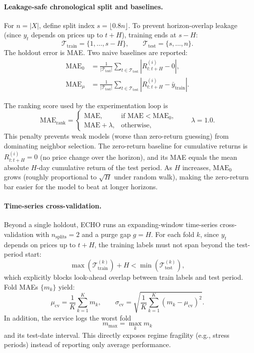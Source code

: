 \documentclass[12pt,a4paper,titlepage]{article}
\begin{document}
\paragraph{Leakage-safe chronological split and baselines.}
For \(n=|X|\), define split index \(s=\lfloor0.8n\rfloor\). To prevent horizon-overlap leakage (since \(y_t\) depends on prices up to \(t+H\)), training ends at \(s-H\):
\[
\mathcal{T}_{\text{train}} = \{1,\dots,s-H\},
\qquad
\mathcal{T}_{\text{test}} = \{s,\dots,n\}.
\]
The holdout error is MAE. Two naive baselines are reported:
\begin{align*}
\text{MAE}_{0} &= \frac{1}{|\mathcal{T}_{\text{test}}|}\sum_{t\in\mathcal{T}_{\text{test}}} |R_{t:t+H}^{(i)} - 0|, \\
\text{MAE}_{\mu} &= \frac{1}{|\mathcal{T}_{\text{test}}|}\sum_{t\in\mathcal{T}_{\text{test}}} |R_{t:t+H}^{(i)} - \bar{y}_{\text{train}}|.
\end{align*}

The ranking score used by the experimentation loop is
\[
\text{MAE}_{\text{rank}}=
\begin{cases}
\text{MAE}, & \text{if } \text{MAE}<\text{MAE}_0,\\
\text{MAE}+\lambda, & \text{otherwise},
\end{cases}
\qquad \lambda=1.0.
\]
This penalty prevents weak models (worse than zero-return guessing) from dominating neighbor selection. The zero-return baseline for cumulative returns is \(R_{t:t+H}^{(i)} = 0\) (no price change over the horizon), and its MAE equals the mean absolute \(H\)-day cumulative return of the test period. As \(H\) increases, \(\text{MAE}_0\) grows (roughly proportional to \(\sqrt{H}\) under random walk), making the zero-return bar easier for the model to beat at longer horizons.

\paragraph{Time-series cross-validation.}
Beyond a single holdout, ECHO runs an expanding-window time-series cross-validation with \(n_{\text{splits}}=2\) and a purge gap \(g=H\). For each fold \(k\), since \(y_t\) depends on prices up to \(t+H\), the training labels must not span beyond the test-period start:
\[
\max(\mathcal{T}^{(k)}_{\text{train}}) + H < \min(\mathcal{T}^{(k)}_{\text{test}}),
\]
which explicitly blocks look-ahead overlap between train labels and test period. Fold MAEs \(\{m_k\}\) yield:
\[
\mu_{\text{cv}}=\frac{1}{K}\sum_{k=1}^{K}m_k,
\qquad
\sigma_{\text{cv}}=\sqrt{\frac{1}{K}\sum_{k=1}^{K}(m_k-\mu_{\text{cv}})^2}.
\]
In addition, the service logs the worst fold
\[
m_{\max}=\max_k m_k
\]
and its test-date interval. This directly exposes regime fragility (e.g., stress periods) instead of reporting only average performance.
\end{document}
